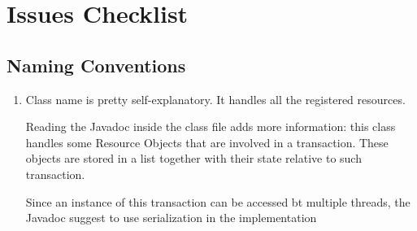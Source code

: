 \section{Issues Checklist}
\subsection{Naming Conventions}
\begin{enumerate}
	\item Class name is pretty self-explanatory. It handles all the registered resources.
	
	Reading the Javadoc inside the class file adds more information: this class handles some Resource Objects that are involved in a transaction. These objects are stored in a list together with their state relative to such transaction.
	
	Since an instance of this transaction can be accessed bt multiple threads, the Javadoc suggest to use serialization in the implementation
	

\end{enumerate}
